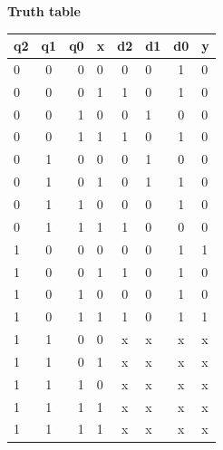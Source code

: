 \documentclass[10pt,a4paper]{report}
\begin{document}
\begin{multicols}{2}
\begin{center}
\begin{tabular}{|l|c|c|}
    \hline
      \end{tabular}
  \end{center}
  \textbf{Truth table}
  \begin{center}
    \label{tab:truthtable}
    \setlength{\arrayrulewidth}{0.5mm}
\setlength{\tabcolsep}{9.9pt}
\renewcommand{\arraystretch}{1.5}
    \begin{tabular}{|l|c|r|l|c|l|c|l|}
    \hline %
      \textbf{q2} & \textbf{q1} & \textbf{q0} & \textbf{x} & \textbf{d2} & \textbf{d1} & \textbf{d0} & \textbf{y}\\
      \hline  \hline
      0 & 0 & 0 & 0 & 0 & 0 & 1 & 0\\  \hline
      0 & 0 & 0 & 1 & 1 & 0 & 1 & 0\\  \hline
      0 & 0 & 1 & 0 & 0 & 1 & 0 & 0\\  \hline
      0 & 0 & 1 & 1 & 1 & 0 & 1 & 0\\ \hline
      0 & 1 & 0 & 0 & 0 & 1 & 0 & 0\\ \hline
      0 & 1 & 0 & 1 & 0 & 1 & 1 & 0\\  \hline
      0 & 1 & 1 & 0 & 0 & 0 & 1 & 0\\ \hline
      0 & 1 & 1 & 1 & 1 & 0 & 0 & 0\\ \hline
      1 & 0 & 0 & 0 & 0 & 0 & 1 & 1\\ \hline
      1 & 0 & 0 & 1 & 1 & 0 & 1 & 0\\ \hline
      1 & 0 & 1 & 0 & 0 & 0 & 1 & 0\\ \hline
      1 & 0 & 1 & 1 & 1 & 0 & 1 & 1\\ \hline
      1 & 1 & 0 & 0 & x & x & x & x\\ \hline
      1 & 1 & 0 & 1 & x & x & x & x\\ \hline
      1 & 1 & 1 & 0 & x & x & x & x\\ \hline
      1 & 1 & 1 & 1 & x & x & x & x\\ \hline
      1 & 1 & 1 & 1 & x & x & x & x\\ 
      \hline
    \end{tabular}
  \end{center} \vspace{2.5mm}

\newcommand{\implicantsol}[3][0]{
    \draw[rounded corners=3pt, fill=#3, opacity=0.3] ($(#2.north west)+(135:#1)$) rectangle ($(#2.south east)+(-45:#1)$);
    }



\end{multicols}
\end{document}
